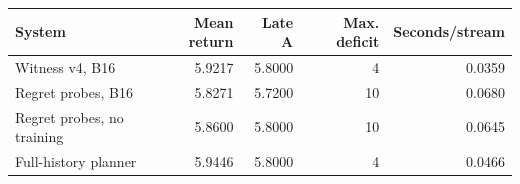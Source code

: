 \begin{tabular}{lrrrr}
\toprule
System & Mean return & Late A & Max. deficit & Seconds/stream \\
\midrule
Witness v4, B16 & 5.9217 & 5.8000 & 4 & 0.0359 \\
Regret probes, B16 & 5.8271 & 5.7200 & 10 & 0.0680 \\
Regret probes, no training & 5.8600 & 5.8000 & 10 & 0.0645 \\
Full-history planner & 5.9446 & 5.8000 & 4 & 0.0466 \\
\bottomrule
\end{tabular}
